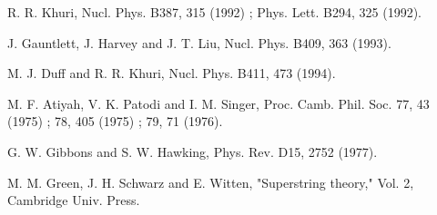 \documentclass[a4paper,aps, amssymb, preprint, 12pt]{revtex4}
\begin{document}
\begin{thebibliography}{99}
R. R. Khuri, Nucl. Phys. B387, 315 (1992) ; Phys. Lett. B294, 325 (1992).

J. Gauntlett, J. Harvey and J. T. Liu, Nucl. Phys. B409, 363 (1993).

M. J. Duff and R. R. Khuri, Nucl. Phys. B411, 473 (1994).

M. F. Atiyah, V. K. Patodi and I. M. Singer, Proc. Camb. Phil. Soc. 77, 43 (1975) ; 78, 405  (1975) ; 79, 71 (1976).



G. W. Gibbons and S. W. Hawking, Phys. Rev. D15, 2752 (1977).

M. M. Green, J. H. Schwarz and E. Witten, "Superstring theory," Vol. 2, Cambridge Univ. Press.



\end{thebibliography}
\end{document}
